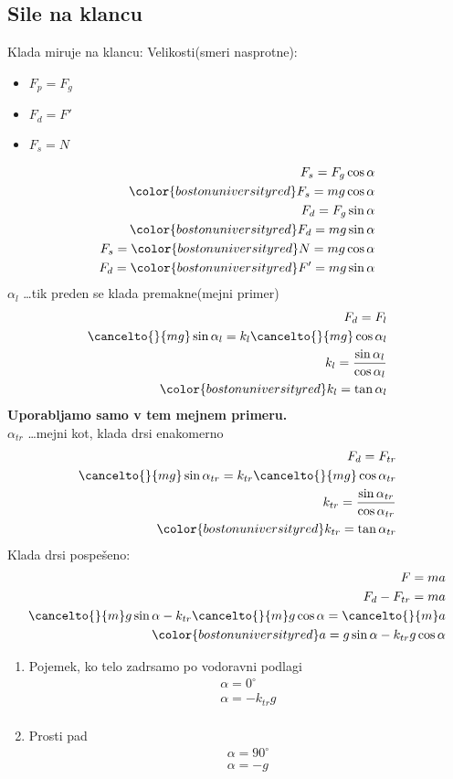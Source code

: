 {\color{indiagreen}\subsection{Sile na klancu}}
Klada miruje na klancu:
Velikosti(smeri nasprotne):
\begin{itemize}
	\item $F_p=F_g$
	\item $F_d=F'$
	\item $F_s=N$
\end{itemize}
\begin{align*}
	F_s = F_g \cos \alpha\\
	{\color{bostonuniversityred}F_s = mg\cos \alpha}\\
	F_d = F_g\sin \alpha\\
	{\color{bostonuniversityred}F_d = mg\sin \alpha}\\
	F_s ={\color{bostonuniversityred} N = mg\cos \alpha}\\
	F_d ={\color{bostonuniversityred} F' = mg\sin \alpha}\\
\end{align*}
$\alpha_l$ \dots tik preden se klada premakne(mejni primer)\\
\begin{align*}
	F_d = F_l\\
	{\cancelto{}{mg}}\sin\alpha_l = k_l{\cancelto{}{mg}}\cos\alpha_l\\
	k_l = \frac{\sin\alpha_l}{\cos\alpha_l}\\
	{\color{bostonuniversityred}k_l = \tan\alpha_l}\\
\end{align*}
\textbf{Uporabljamo samo v tem mejnem primeru.}\\
$\alpha_{tr}$ \dots mejni kot, klada drsi enakomerno\\
\begin{align*}
	F_d = F_{tr}\\
	{\cancelto{}{mg}}\sin\alpha_{tr} = k_{tr}{\cancelto{}{mg}}\cos\alpha_{tr}\\
	k_{tr} = \frac{\sin\alpha_{tr}}{\cos\alpha_{tr}}\\
	{\color{bostonuniversityred}k_{tr} = \tan\alpha_{tr}}\\
\end{align*}
Klada drsi pospešeno:
\begin{align*}
	F = ma\\
	F_d - F_{tr} = ma\\
	{\cancelto{}{m}}g\sin\alpha - k_{tr}{\cancelto{}{m}}g\cos\alpha ={\cancelto{}{m}}a\\
	{\color{bostonuniversityred}a = g\sin\alpha - k_{tr}g\cos\alpha}
\end{align*}
\begin{enumerate}
	\item Pojemek, ko telo zadrsamo po vodoravni podlagi\\
	\begin{align*}
		\alpha = 0^{\circ}\\
		\alpha = -k_{tr}g\\
	\end{align*}
	\item Prosti pad\\
	\begin{align*}
		\alpha = 90^{\circ}\\
		\alpha = -g\\
	\end{align*}
\end{enumerate}